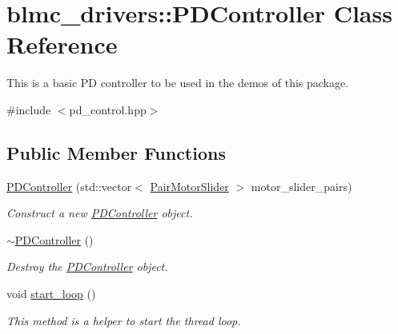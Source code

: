 \hypertarget{classblmc__drivers_1_1PDController}{}\section{blmc\+\_\+drivers\+:\+:P\+D\+Controller Class Reference}
\label{classblmc__drivers_1_1PDController}


This is a basic PD controller to be used in the demos of this package.  




{\ttfamily \#include $<$pd\+\_\+control.\+hpp$>$}

\subsection*{Public Member Functions}
\begin{DoxyCompactItemize}
\item 
\hyperlink{classblmc__drivers_1_1PDController_a78e3d01f6bcc263b20b81a7525d072cf}{P\+D\+Controller} (std\+::vector$<$ \hyperlink{namespaceblmc__drivers_a134270c90d29a9a28b64ab0e5f7158f7}{Pair\+Motor\+Slider} $>$ motor\+\_\+slider\+\_\+pairs)
\begin{DoxyCompactList}\small\item\em Construct a new \hyperlink{classblmc__drivers_1_1PDController}{P\+D\+Controller} object. \end{DoxyCompactList}\item 
\hyperlink{classblmc__drivers_1_1PDController_aed8ffc7914eb5976f95936315bcd9c47}{$\sim$\+P\+D\+Controller} ()\hypertarget{classblmc__drivers_1_1PDController_aed8ffc7914eb5976f95936315bcd9c47}{}\label{classblmc__drivers_1_1PDController_aed8ffc7914eb5976f95936315bcd9c47}

\begin{DoxyCompactList}\small\item\em Destroy the \hyperlink{classblmc__drivers_1_1PDController}{P\+D\+Controller} object. \end{DoxyCompactList}\item 
void \hyperlink{classblmc__drivers_1_1PDController_a9c9258e9f1af0f4ca00d2ede682ad511}{start\+\_\+loop} ()\hypertarget{classblmc__drivers_1_1PDController_a9c9258e9f1af0f4ca00d2ede682ad511}{}\label{classblmc__drivers_1_1PDController_a9c9258e9f1af0f4ca00d2ede682ad511}

\begin{DoxyCompactList}\small\item\em This method is a helper to start the thread loop. \end{DoxyCompactList}\end{DoxyCompactItemize}

